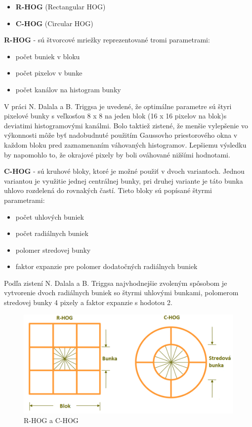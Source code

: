 \begin{itemize}
\item \textbf{R-HOG} (Rectangular HOG)
\item \textbf{C-HOG} (Circular HOG)
\end{itemize}


\textbf{R-HOG} - sú štvorcové mriežky reprezentované tromi parametrami:
\begin{itemize}
\item počet buniek v bloku
\item počet pixelov v bunke
\item počet kanálov na histogram bunky
\end{itemize}

V práci N. Dalala a B. Triggsa je uvedené, že optimálne parametre sú štyri pixelové bunky s veľkosťou  8 x 8 na jeden blok (16 x 16 pixelov na blok)s deviatimi histogramovými kanálmi. Bolo taktiež zistené, že menšie vylepšenie vo výkonnosti môže byť nadobudnuté použitím Gaussovho priestorového okna v každom bloku pred zaznamenaním váhovaných histogramov. Lepšiemu výsledku by napomohlo to, že okrajové pixely by boli ováhované nižšími hodnotami. 

\textbf{C-HOG} - sú kruhové bloky, ktoré je možné použiť v dvoch variantoch. Jednou variantou je využitie jednej centrálnej bunky, pri druhej variante je táto bunka uhlovo rozdelená do rovnakých častí. Tieto bloky sú popísané štyrmi parametrami:

\begin{itemize}
\item počet uhlových buniek
\item počet radiálnych buniek
\item polomer stredovej bunky
\item faktor expanzie pre polomer dodatočných radiálnych buniek
\end{itemize}

Podľa zistení N. Dalala a B. Triggsa najvhodnejšie zvoleným spôsobom je vytvorenie dvoch radiálnych buniek so štyrmi uhlovými bunkami, polomerom stredovej bunky 4 pixely a faktor expanzie s hodotou 2. 


\begin{figure}[H]
  \centering
  \includegraphics[width=14cm]{img/HOGimg.png}
  \caption{R-HOG a C-HOG}
  \label{HOGimg}
\end{figure}

